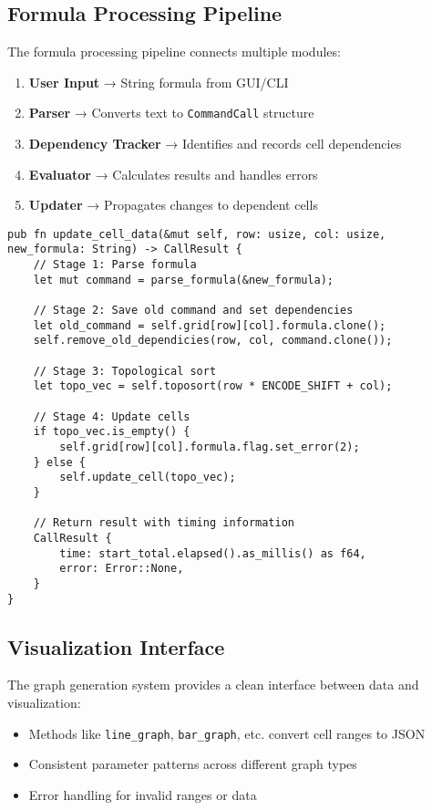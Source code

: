 \documentclass[12pt]{article}
\begin{document}
\subsection{Formula Processing Pipeline}
The formula processing pipeline connects multiple modules:
\begin{enumerate}
    \item \textbf{User Input} → String formula from GUI/CLI
    \item \textbf{Parser} → Converts text to \texttt{CommandCall} structure
    \item \textbf{Dependency Tracker} → Identifies and records cell dependencies
    \item \textbf{Evaluator} → Calculates results and handles errors
    \item \textbf{Updater} → Propagates changes to dependent cells
\end{enumerate}

\begin{lstlisting}[caption={Formula processing interface}]
pub fn update_cell_data(&mut self, row: usize, col: usize, new_formula: String) -> CallResult {
    // Stage 1: Parse formula
    let mut command = parse_formula(&new_formula);
    
    // Stage 2: Save old command and set dependencies
    let old_command = self.grid[row][col].formula.clone();
    self.remove_old_dependicies(row, col, command.clone());
    
    // Stage 3: Topological sort
    let topo_vec = self.toposort(row * ENCODE_SHIFT + col);
    
    // Stage 4: Update cells
    if topo_vec.is_empty() {
        self.grid[row][col].formula.flag.set_error(2);
    } else {
        self.update_cell(topo_vec);
    }
    
    // Return result with timing information
    CallResult {
        time: start_total.elapsed().as_millis() as f64,
        error: Error::None,
    }
}
\end{lstlisting}

\subsection{Visualization Interface}
The graph generation system provides a clean interface between data and visualization:
\begin{itemize}
    \item Methods like \texttt{line\_graph}, \texttt{bar\_graph}, etc. convert cell ranges to JSON
    \item Consistent parameter patterns across different graph types
    \item Error handling for invalid ranges or data
\end{itemize}
\end{document}
